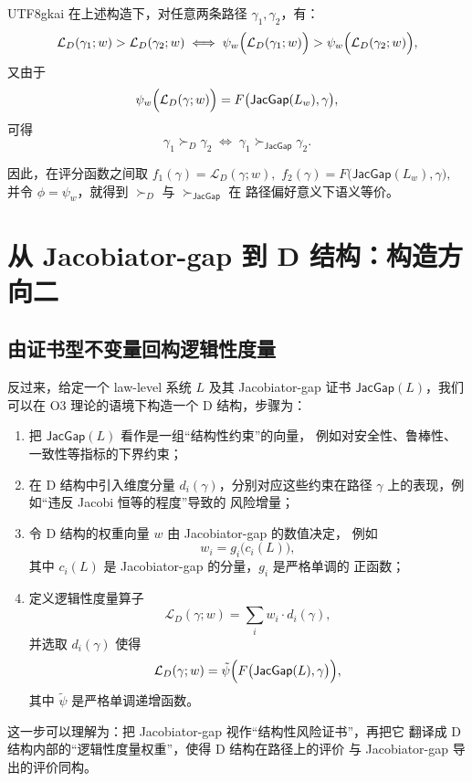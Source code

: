 \documentclass[12pt]{article}
\newcommand{\JacGap}{\mathsf{JacGap}}
\begin{document}
\begin{CJK*}{UTF8}{gkai}
在上述构造下，对任意两条路径 $\gamma_1,\gamma_2$，有：
\[
  \mathcal{L}_D(\gamma_1;w)>\mathcal{L}_D(\gamma_2;w)
  \;\Longleftrightarrow\;
  \psi_w\Bigl(\mathcal{L}_D(\gamma_1;w)\Bigr)
  >
  \psi_w\Bigl(\mathcal{L}_D(\gamma_2;w)\Bigr),
\]
又由于
\[
  \psi_w\Bigl(\mathcal{L}_D(\gamma;w)\Bigr)
  =
  F\bigl(\JacGap(L_w),\gamma\bigr),
\]
可得
\[
  \gamma_1\succ_D\gamma_2
  \;\Longleftrightarrow\;
  \gamma_1\succ_{\JacGap}\gamma_2.
\]

因此，在评分函数之间取
$
  f_1(\gamma)=\mathcal{L}_D(\gamma;w),
$
$
  f_2(\gamma)=F\bigl(\JacGap(L_w),\gamma\bigr),
$
并令 $\phi=\psi_w$，就得到 $\succ_D$ 与 $\succ_{\JacGap}$ 在
路径偏好意义下语义等价。

\section{从 Jacobiator-gap 到 D 结构：构造方向二}

\subsection{由证书型不变量回构逻辑性度量}

反过来，给定一个 law-level 系统 $L$ 及其 Jacobiator-gap 证书
$\JacGap(L)$，我们可以在 O3 理论的语境下构造一个 D 结构，步骤为：
\begin{enumerate}
  \item 把 $\JacGap(L)$ 看作是一组“结构性约束”的向量，
        例如对安全性、鲁棒性、一致性等指标的下界约束；
  \item 在 D 结构中引入维度分量 $d_i(\gamma)$，分别对应这些约束在路径
        $\gamma$ 上的表现，例如“违反 Jacobi 恒等的程度”导致的
        风险增量；
  \item 令 D 结构的权重向量 $w$ 由 Jacobiator-gap 的数值决定，
        例如
        \[
          w_i = g_i\bigl(c_i(L)\bigr),
        \]
        其中 $c_i(L)$ 是 Jacobiator-gap 的分量，$g_i$ 是严格单调的
        正函数；
  \item 定义逻辑性度量算子
        \[
          \mathcal{L}_D(\gamma;w)
          =
          \sum_i w_i\cdot d_i(\gamma),
        \]
        并选取 $d_i(\gamma)$ 使得
        \[
          \mathcal{L}_D(\gamma;w)
          =
          \tilde{\psi}\Bigl(
            F\bigl(\JacGap(L),\gamma\bigr)
          \Bigr),
        \]
        其中 $\tilde{\psi}$ 是严格单调递增函数。
\end{enumerate}

这一步可以理解为：把 Jacobiator-gap 视作“结构性风险证书”，再把它
翻译成 D 结构内部的“逻辑性度量权重”，使得 D 结构在路径上的评价
与 Jacobiator-gap 导出的评价同构。


\end{CJK*}
\end{document}
